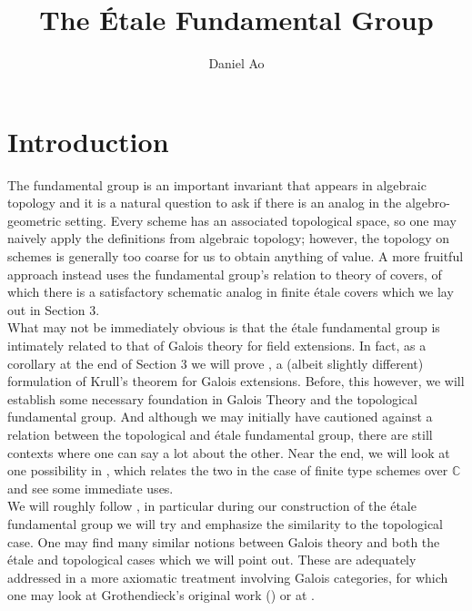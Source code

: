 \documentclass{article}
\theoremstyle{definition}
\theoremstyle{remark}
\theoremstyle{plain}
\newcommand{\C}{\mathbb{C}}
\begin{document}
\title{The \'Etale Fundamental Group}
\author{Daniel Ao}

\maketitle

\tableofcontents

\section{Introduction}

The fundamental group is an important invariant that appears in algebraic topology and it is a natural question to ask if there is an analog in the algebro-geometric setting.
Every scheme has an associated topological space, so one may naively apply the definitions from algebraic topology; however, the topology on schemes is generally too coarse for us to obtain anything of value.
A more fruitful approach instead uses the fundamental group's relation to theory of covers, of which there is a satisfactory schematic analog in finite \'etale covers which we lay out in Section 3.\\

What may not be immediately obvious is that the \'etale fundamental group is intimately related to that of Galois theory for field extensions. 
In fact, as a corollary at the end of Section 3 we will prove , a (albeit slightly different) formulation of Krull's theorem for Galois extensions.
Before, this however, we will establish some necessary foundation in Galois Theory and the topological fundamental group. 
And although we may initially have cautioned against a relation between the topological and \'etale fundamental group, there are still contexts where one can say a lot about the other.
Near the end, we will look at one possibility in , which relates the two in the case of finite type schemes over $\C$ and see some immediate uses.\\

\indent We will roughly follow \cite{Szamuely}, in particular during our construction of the \'etale fundamental group we will try and emphasize the similarity to the topological case.
One may find many similar notions between Galois theory and both the \'etale and topological cases which we will point out.
These are adequately addressed in a more axiomatic treatment involving Galois categories, for which one may look at Grothendieck's original work (\cite{grothendieck}) or at \cite{Lenstra}.
\end{document}
